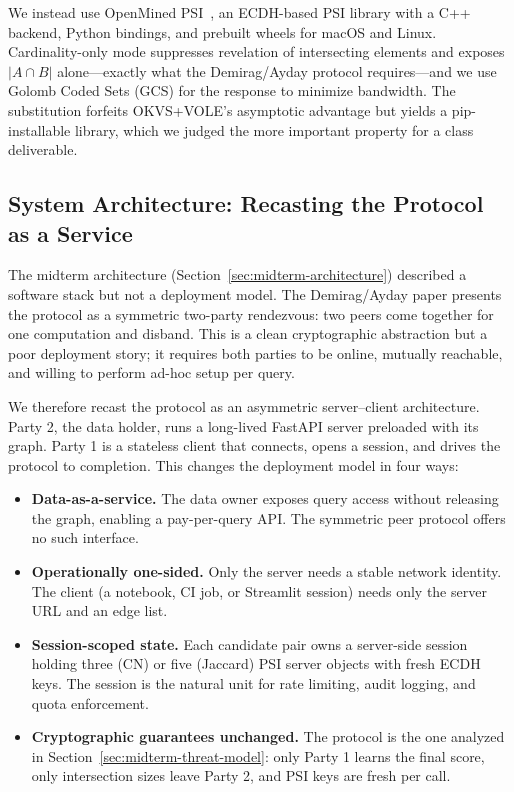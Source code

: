 \documentclass[sigconf]{acmart}
\begin{document}
We instead use OpenMined PSI~\cite{openminedpsi}, an ECDH-based PSI library with a C++ backend, Python bindings, and prebuilt wheels for macOS and Linux. Cardinality-only mode suppresses revelation of intersecting elements and exposes $|A \cap B|$ alone---exactly what the Demirag/Ayday protocol requires---and we use Golomb Coded Sets (GCS) for the response to minimize bandwidth. The substitution forfeits OKVS+VOLE's asymptotic advantage but yields a pip-installable library, which we judged the more important property for a class deliverable.

\subsection{System Architecture: Recasting the Protocol as a Service}
\label{sec:server-client}
The midterm architecture (Section~\ref{sec:midterm-architecture}) described a software stack but not a deployment model. The Demirag/Ayday paper presents the protocol as a symmetric two-party rendezvous: two peers come together for one computation and disband. This is a clean cryptographic abstraction but a poor deployment story; it requires both parties to be online, mutually reachable, and willing to perform ad-hoc setup per query.

We therefore recast the protocol as an asymmetric server--client architecture. Party 2, the data holder, runs a long-lived FastAPI server preloaded with its graph. Party 1 is a stateless client that connects, opens a session, and drives the protocol to completion. This changes the deployment model in four ways:

\begin{itemize}
  \item \textbf{Data-as-a-service.} The data owner exposes query access without releasing the graph, enabling a pay-per-query API. The symmetric peer protocol offers no such interface.
  \item \textbf{Operationally one-sided.} Only the server needs a stable network identity. The client (a notebook, CI job, or Streamlit session) needs only the server URL and an edge list.
  \item \textbf{Session-scoped state.} Each candidate pair owns a server-side session holding three (CN) or five (Jaccard) PSI server objects with fresh ECDH keys. The session is the natural unit for rate limiting, audit logging, and quota enforcement.
  \item \textbf{Cryptographic guarantees unchanged.} The protocol is the one analyzed in Section~\ref{sec:midterm-threat-model}: only Party 1 learns the final score, only intersection sizes leave Party 2, and PSI keys are fresh per call.
\end{itemize}
\end{document}

